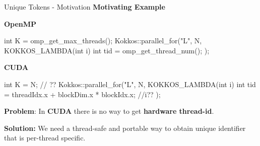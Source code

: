 
\begin{frame}[fragile]{Unique Tokens - Motivation}
\vspace{-10pt}
\textbf{Motivating Example}

\vspace{5pt}
\textbf{OpenMP}
    \begin{code}[frame=single, keywords={}]
int K = omp_get_max_threads();
Kokkos::parallel_for("L", N, KOKKOS_LAMBDA(int i) {
  int tid = omp_get_thread_num();
});
    \end{code}

\vspace{5pt}
\textbf{CUDA}
    \begin{code}[frame=single, keywords={}]
int K = N; // ??
Kokkos::parallel_for("L", N, KOKKOS_LAMBDA(int i) {
  int tid = threadIdx.x + blockDim.x * blockIdx.x; //i??
});
    \end{code}

\pause
  \textbf{{\color{red}Problem}}: In \textbf{CUDA} there is no way to get \textbf{hardware thread-id}.

  \vspace{5pt}
  \pause

  \textbf{Solution:} We need a thread-safe and portable way to obtain unique identifier that is per-thread specific.

  \vspace{5pt}


  \vspace{-5pt}

\end{frame}


